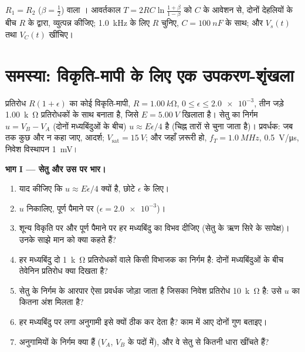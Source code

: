\begin{exercise}[$\star\star\star$]\label{exo:b1:operational-amplifier:12}
$R_1 = R_2$ ($\beta = \tfrac12$) वाला । आवर्तकाल
$T = 2RC\ln\frac{1 + \beta}{1 - \beta}$ को $C$ के आवेशन से, दोनों देहलियों
के बीच $R$ के द्वारा, व्युत्पन्न कीजिए; \qty{1.0}{kHz} के लिए $R$ चुनिए,
$C = \qty{100}{nF}$ के साथ; और $V_s(t)$ तथा $V_C(t)$ खींचिए।
\end{exercise}

\section{समस्या: विकृति-मापी के लिए एक उपकरण-शृंखला}

\begin{problem}
\label{pb:b1:operational-amplifier:1}
प्रतिरोध $R(1 + \epsilon)$ का कोई विकृति-मापी, $R = \qty{1.00}{k\ohm}$,
$0 \leq \epsilon \leq \num{2.0e-3}$, तीन जड़े \qty{1.00}{k\ohm} प्रतिरोधकों
के साथ  बनाता है, जिसे $E = \qty{5.00}{V}$ खिलाता है।
सेतु का निर्गम $u = V_B - V_A$ (दोनों मध्यबिंदुओं के बीच)
$u \approx E\epsilon/4$ है (चिह्न तारों से चुना जाता है)। प्रवर्धक:
जब तक कुछ और न कहा जाए, आदर्श; $V_{\mathrm{sat}} = \qty{15}{V}$; और जहाँ ज़रूरी हो,
$f_T = \qty{1.0}{MHz}$,  \qty{0.5}{V/\micro s}, निवेश विस्थापन
\qty{1}{mV}।

\medskip
\noindent\textbf{भाग I --- सेतु और उस पर भार।}
\begin{enumerate}
  \item याद कीजिए कि $u \approx E\epsilon/4$ क्यों है, छोटे $\epsilon$ के लिए।
  \item $u$ निकालिए, पूर्ण पैमाने पर ($\epsilon = \num{2.0e-3}$)।
  \item शून्य विकृति पर और पूर्ण पैमाने पर हर मध्यबिंदु का विभव दीजिए
        (सेतु के ऋण सिरे के सापेक्ष)। उनके साझे मान को क्या कहते हैं?
  \item हर मध्यबिंदु दो \qty{1}{k\ohm} प्रतिरोधकों वाले किसी विभाजक का
        निर्गम है: दोनों मध्यबिंदुओं के बीच तेवेनिन प्रतिरोध क्या दिखता है?
  \item सेतु के निर्गम के आरपार ऐसा प्रवर्धक जोड़ा जाता है जिसका निवेश
        प्रतिरोध \qty{10}{k\ohm} है: उसे $u$ का कितना अंश मिलता है?
  \item हर मध्यबिंदु पर लगा अनुगामी इसे क्यों ठीक कर देता है? काम में आए
        दोनों गुण बताइए।
  \item अनुगामियों के निर्गम  क्या हैं ($V_A$, $V_B$ के पदों में),
        और वे सेतु से कितनी धारा खींचते हैं?
\end{enumerate}


\end{problem}
